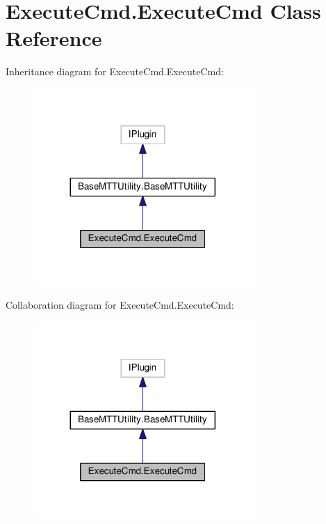 \hypertarget{classExecuteCmd_1_1ExecuteCmd}{\section{Execute\-Cmd.\-Execute\-Cmd Class Reference}
\label{classExecuteCmd_1_1ExecuteCmd}
}


Inheritance diagram for Execute\-Cmd.\-Execute\-Cmd\-:
\nopagebreak
\begin{figure}[H]
\begin{center}
\leavevmode
\includegraphics[width=236pt]{classExecuteCmd_1_1ExecuteCmd__inherit__graph}
\end{center}
\end{figure}


Collaboration diagram for Execute\-Cmd.\-Execute\-Cmd\-:
\nopagebreak
\begin{figure}[H]
\begin{center}
\leavevmode
\includegraphics[width=236pt]{classExecuteCmd_1_1ExecuteCmd__coll__graph}
\end{center}
\end{figure}

